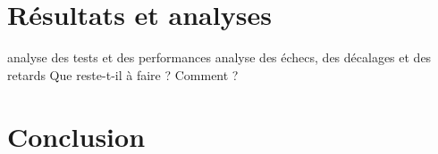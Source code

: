 \chapter{Résultats et analyses}

analyse des tests et des performances
analyse des échecs, des décalages et des retards
Que reste-t-il à faire ? Comment ?


\chapter{Conclusion}

